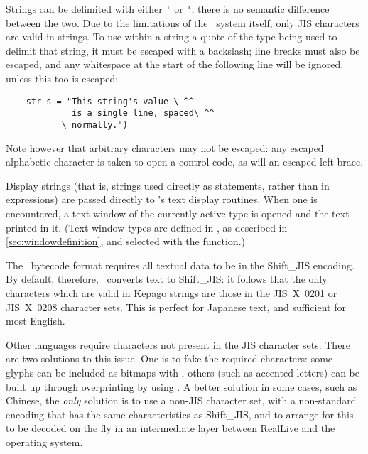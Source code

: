 \label{sec:strings}

  Strings can be delimited with either \lstinline|'| or \lstinline|"|; there is
  no semantic difference between the two.  Due to the limitations of the
  \reallive\ system itself, only JIS characters are valid in strings. To use
  within a string a quote of the type being used to delimit that string, it must
  be escaped with a backslash; line breaks must also be escaped, and any
  whitespace at the start of the following line will be ignored, unless this too
  is escaped:
  \begin{lstlisting}
    str s = "This string's value \ ^^
             is a single line, spaced\ ^^
           \ normally.")
  \end{lstlisting}

  Note however that arbitrary characters may not be escaped: any escaped
  alphabetic character is taken to open a control code, as will an escaped left
  brace.


    Display strings (that is, strings used directly as statements, rather than
    in expressions) are passed directly to \reallive's text display routines.
    When one is encountered, a text window of the currently active type is
    opened and the text printed in it.  (Text window types are defined in
    \gameexe, as described in \ref{sec:windowdefinition}, and selected with the
    \fnref{TextWindow} function.)

  \label{sec:encodings}

    The \reallive\ bytecode format requires all textual data to be in the 
    Shift\_JIS encoding.  By default, therefore, \package\ converts text to 
    Shift\_JIS: it follows that the only characters which are valid in Kepago 
    strings are those in the JIS~X~0201 or JIS~X~0208 character sets. This is 
    perfect for Japanese text, and sufficient for most English.
    
    Other languages require characters not present in the JIS character sets. 
    There are two solutions to this issue.  One is to fake the required 
    characters: some glyphs can be included as bitmaps with \ccref{em}, others 
    (such as accented letters) can be built up through overprinting by using 
    \ccref{mv}. A better solution\,\textemdash\,in some cases, such as Chinese, the 
    \emph{only} solution\,\textemdash\,is to use a non-JIS character set, with a 
    non-standard encoding that has the same characteristics as Shift\_JIS, and to 
    arrange for this to be decoded on the fly in an intermediate layer between 
    RealLive and the operating system.
    
